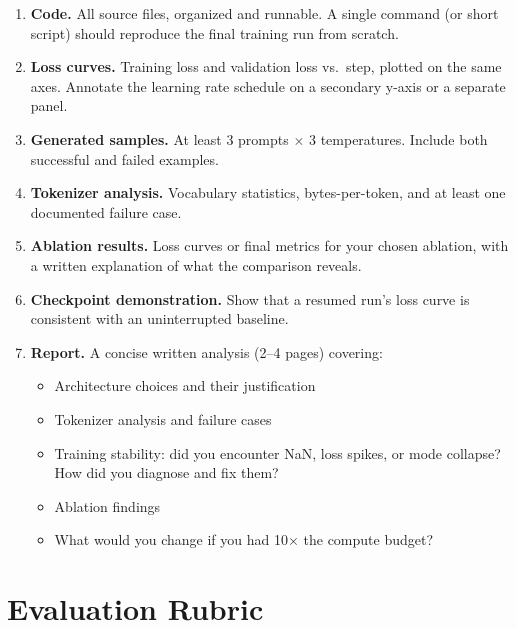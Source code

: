 \begin{enumerate}[nosep]
  \item \textbf{Code.} All source files, organized and runnable. A single command (or short script) should reproduce the final training run from scratch.

  \item \textbf{Loss curves.} Training loss and validation loss vs.\ step, plotted on the same axes. Annotate the learning rate schedule on a secondary y-axis or a separate panel.

  \item \textbf{Generated samples.} At least 3 prompts $\times$ 3 temperatures. Include both successful and failed examples.

  \item \textbf{Tokenizer analysis.} Vocabulary statistics, bytes-per-token, and at least one documented failure case.

  \item \textbf{Ablation results.} Loss curves or final metrics for your chosen ablation, with a written explanation of what the comparison reveals.

  \item \textbf{Checkpoint demonstration.} Show that a resumed run's loss curve is consistent with an uninterrupted baseline.

  \item \textbf{Report.} A concise written analysis (2--4 pages) covering:
  \begin{itemize}[nosep]
    \item Architecture choices and their justification
    \item Tokenizer analysis and failure cases
    \item Training stability: did you encounter NaN, loss spikes, or mode collapse? How did you diagnose and fix them?
    \item Ablation findings
    \item What would you change if you had 10$\times$ the compute budget?
  \end{itemize}
\end{enumerate}


\section*{Evaluation Rubric}


